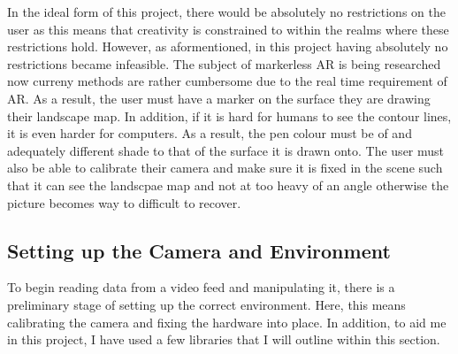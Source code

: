 \documentclass[11pt]{article}
\begin{document}
In the ideal form of this project, there would be absolutely no
restrictions on the user as this means that creativity is constrained
to within the realms where these restrictions hold. However, as 
aformentioned, in this project having absolutely no restrictions became
infeasible. The subject of markerless AR is being researched now curreny 
methods are rather cumbersome due to the real time requirement of AR. As
a result, the user must have a marker on the surface they are drawing their
landscape map. In addition, if it is hard for humans to see the contour
lines, it is even harder for computers. As a result, the pen colour must
be of and adequately different shade to that of the surface it is drawn onto.
The user must also be able to calibrate their camera and make sure it
is fixed in the scene such that it can see the landscpae map and not at
too heavy of an angle otherwise the picture becomes way to difficult to 
recover.

\subsection{Setting up the Camera and Environment}
To begin reading data from a video feed and manipulating it, there 
is a preliminary stage of setting up the correct environment. Here,
this means calibrating the camera and fixing the hardware into place.
In addition, to aid me in this project, I have used a few libraries that
I will outline within this section.
\end{document}
